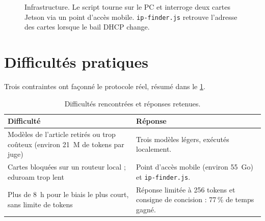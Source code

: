 \begin{figure}[htbp]
  \centering
  \caption{Infrastructure. Le script tourne sur le PC et interroge deux cartes Jetson via un point d'accès mobile. \texttt{ip-finder.js} retrouve l'adresse des cartes lorsque le bail DHCP change.}
  \label{fig-infra}
\end{figure}

\section{Difficultés pratiques}

Trois contraintes ont façonné le protocole réel, résumé dans le \cref{tab-difficulties}.

\begin{table}[htbp]
  \centering
  \small
  \caption{Difficultés rencontrées et réponses retenues.}
  \label{tab-difficulties}
  \begin{tabularx}{\textwidth}{>{\raggedright\arraybackslash}p{5.8cm}X}
    \toprule
    \textbf{Difficulté} & \textbf{Réponse} \\
    \midrule
    Modèles de l'article retirés ou trop coûteux (environ 21~M de tokens par juge) & Trois modèles légers, exécutés localement. \\
    Cartes bloquées sur un routeur local ; eduroam trop lent & Point d'accès mobile (environ 55~Go) et \texttt{ip-finder.js}. \\
    Plus de 8~h pour le biais le plus court, sans limite de tokens & Réponse limitée à 256 tokens et consigne de concision : 77\,\% de temps gagné. \\
    \bottomrule
  \end{tabularx}
\end{table}

